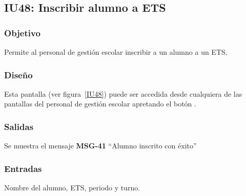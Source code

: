 
\subsection{IU48: Inscribir alumno a ETS}

\subsubsection{Objetivo}
Permite al personal de gestión escolar inscribir a un alumno a un ETS.
\subsubsection{Diseño}
Esta pantalla  (ver figura~\ref{IU48}) puede ser accedida desde cualquiera de las pantallas del personal de gestión escolar apretando el botón .


\subsubsection{Salidas}
Se muestra el mensaje {\bf MSG-41} ``Alumno inscrito con éxito''
\subsubsection{Entradas}
Nombre del alumno, ETS, periodo y turno.
